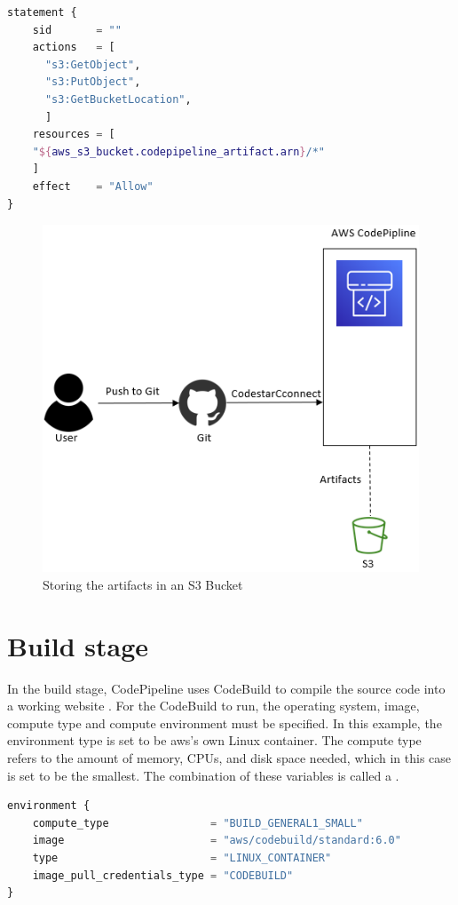 \vspace{4mm}
\begin{lstlisting}[language=terraform, caption=Set permissions CodePipeline, captionpos=b, frame=single, label=lst:grantaccess]
statement {
    sid       = ""
    actions   = [
      "s3:GetObject",
      "s3:PutObject",
      "s3:GetBucketLocation", 
      ]
    resources = [
    "${aws_s3_bucket.codepipeline_artifact.arn}/*"
    ]
    effect    = "Allow"
}
\end{lstlisting}

\vspace{2mm}
\begin{figure}[H]
    \centering
    \includegraphics[width=0.6\columnwidth]{Images/aws-piplin-2.png}
    \caption{Storing the artifacts in an S3 Bucket}
    \label{fig: Storing the artifacts in an S3 Bucket}
\end{figure}

\section{Build stage}
In the build stage, CodePipeline uses CodeBuild to compile the source code into a working website \cite{CodeBuildProcess}. For the CodeBuild to run, the operating system, image, compute type and compute environment must be specified. In this example, the environment type is set to be \acrshort{aws}'s own Linux container. The compute type refers to the amount of memory, CPUs, and disk space needed, which in this case is set to be the smallest. The combination of these variables is called a .

\vspace{2mm}
\begin{lstlisting}[language=terraform, caption=Create build environment, captionpos=b, frame=single]
environment {
    compute_type                = "BUILD_GENERAL1_SMALL"
    image                       = "aws/codebuild/standard:6.0"
    type                        = "LINUX_CONTAINER"
    image_pull_credentials_type = "CODEBUILD"
}
\end{lstlisting}

